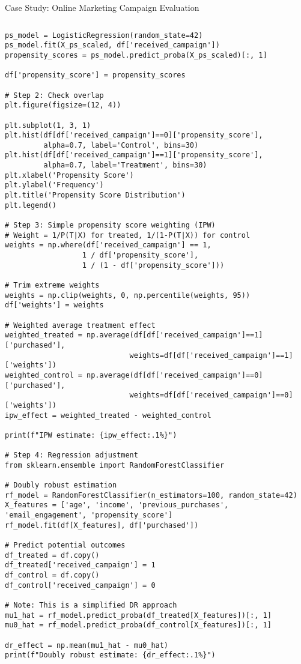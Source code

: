 \documentclass[aspectratio=169,11pt]{beamer}
\begin{document}
\begin{frame}[fragile]{Case Study: Online Marketing Campaign Evaluation}
\begin{columns}
\begin{column}{0.55\textwidth}
\begin{lstlisting}[basicstyle=\ttfamily\tiny]
ps_model = LogisticRegression(random_state=42)
ps_model.fit(X_ps_scaled, df['received_campaign'])
propensity_scores = ps_model.predict_proba(X_ps_scaled)[:, 1]

df['propensity_score'] = propensity_scores

# Step 2: Check overlap
plt.figure(figsize=(12, 4))

plt.subplot(1, 3, 1)
plt.hist(df[df['received_campaign']==0]['propensity_score'], 
         alpha=0.7, label='Control', bins=30)
plt.hist(df[df['received_campaign']==1]['propensity_score'], 
         alpha=0.7, label='Treatment', bins=30)
plt.xlabel('Propensity Score')
plt.ylabel('Frequency')
plt.title('Propensity Score Distribution')
plt.legend()

# Step 3: Simple propensity score weighting (IPW)
# Weight = 1/P(T|X) for treated, 1/(1-P(T|X)) for control
weights = np.where(df['received_campaign'] == 1, 
                  1 / df['propensity_score'],
                  1 / (1 - df['propensity_score']))

# Trim extreme weights
weights = np.clip(weights, 0, np.percentile(weights, 95))
df['weights'] = weights

# Weighted average treatment effect
weighted_treated = np.average(df[df['received_campaign']==1]['purchased'], 
                             weights=df[df['received_campaign']==1]['weights'])
weighted_control = np.average(df[df['received_campaign']==0]['purchased'], 
                             weights=df[df['received_campaign']==0]['weights'])
ipw_effect = weighted_treated - weighted_control

print(f"IPW estimate: {ipw_effect:.1%}")

# Step 4: Regression adjustment
from sklearn.ensemble import RandomForestClassifier

# Doubly robust estimation
rf_model = RandomForestClassifier(n_estimators=100, random_state=42)
X_features = ['age', 'income', 'previous_purchases', 'email_engagement', 'propensity_score']
rf_model.fit(df[X_features], df['purchased'])

# Predict potential outcomes
df_treated = df.copy()
df_treated['received_campaign'] = 1
df_control = df.copy()
df_control['received_campaign'] = 0

# Note: This is a simplified DR approach
mu1_hat = rf_model.predict_proba(df_treated[X_features])[:, 1]
mu0_hat = rf_model.predict_proba(df_control[X_features])[:, 1]

dr_effect = np.mean(mu1_hat - mu0_hat)
print(f"Doubly robust estimate: {dr_effect:.1%}")


\end{lstlisting}
\end{column}
\end{columns}
\end{frame}
\end{document}
